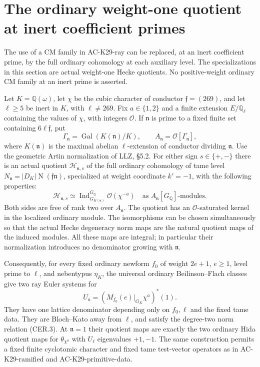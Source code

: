 \section{The ordinary weight-one quotient at inert coefficient primes}
\label{sec:cubic-inert-coefficient}

The use of a CM family in AC-K29-ray can be replaced, at an
inert coefficient prime, by the full ordinary cohomology at each
auxiliary level.  The specializations in this section are actual
weight-one Hecke quotients.  No positive-weight ordinary CM family
at an inert prime is asserted.

\begin{proposition}
\label{AC-K29-inert-ray}
Let $K=\mathbb Q(\omega)$, let $\chi$ be the cubic character
of conductor $\mathfrak f=(269)$, and let $\ell\ge5$ be inert
in $K$, with $\ell\ne269$.  Fix $a\in\{1,2\}$ and a finite
extension $E/\mathbb Q_\ell$ containing the values of $\chi$,
with integers $\mathcal O$.  If $\mathfrak n$ is prime to a
fixed finite set containing $6\ell\mathfrak f$, put
\[
 \Gamma_{\mathfrak n}=\operatorname{Gal}(K(\mathfrak n)/K),
 \qquad A_{\mathfrak n}=\mathcal O[\Gamma_{\mathfrak n}],
                                                        \tag{CIC.1}
\]
where $K(\mathfrak n)$ is the maximal abelian $\ell$-extension
of conductor dividing $\mathfrak n$.  Use the geometric Artin
normalization of LLZ, \S5.2.  For either sign $s\in\{+,-\}$
there is an actual quotient $\mathcal H_{\mathfrak n,s}$ of
the full ordinary cohomology of tame level
$N_{\mathfrak n}=|D_K|\operatorname N(\mathfrak f\mathfrak n)$,
specialized at weight coordinate $k'=-1$, with the following
properties:
\[
 \mathcal H_{\mathfrak n,s}\simeq
 \operatorname{Ind}_{G_{K(\mathfrak n)}}^{G_{\mathbb Q}}
                  \mathcal O(\chi^{-a})
 \quad\text{as }A_{\mathfrak n}[G_{\mathbb Q}]\text{-modules}.
                                                        \tag{CIC.2}
\]
Both sides are free of rank two over $A_{\mathfrak n}$.
The quotient has an $\mathcal O$-saturated kernel in the
localized ordinary module.
The isomorphisms can be chosen simultaneously so that the
actual Hecke degeneracy norm maps are the natural quotient
maps of the induced modules.  All these maps are integral;
in particular their normalization introduces no denominator
growing with $\mathfrak n$.

Consequently, for every fixed ordinary newform $f_0$ of
weight $2e+1$, $e\ge1$, level prime to $\ell$, and nebentypus
$\eta_K$, the universal ordinary Beilinson--Flach classes
give two ray Euler systems for
\[
 U_a=(M_{f_0}(e)|_{G_K}\chi^a)^*(1).
                                                        \tag{CIC.3}
\]
They have one lattice denominator depending only on
$f_0,\ell$ and the fixed tame data.  They are Bloch--Kato
away from $\ell$, and satisfy the degree-two norm relation
(CER.3).  At $\mathfrak n=1$ their quotient maps are exactly
the two ordinary Hida quotient maps for
$\theta_{\chi^a}$ with $U_\ell$ eigenvalues $+1,-1$.
The same construction permits a fixed finite cyclotomic
character and fixed tame test-vector operators as in
AC-K29-ramified and AC-K29-primitive-data.
\end{proposition}

